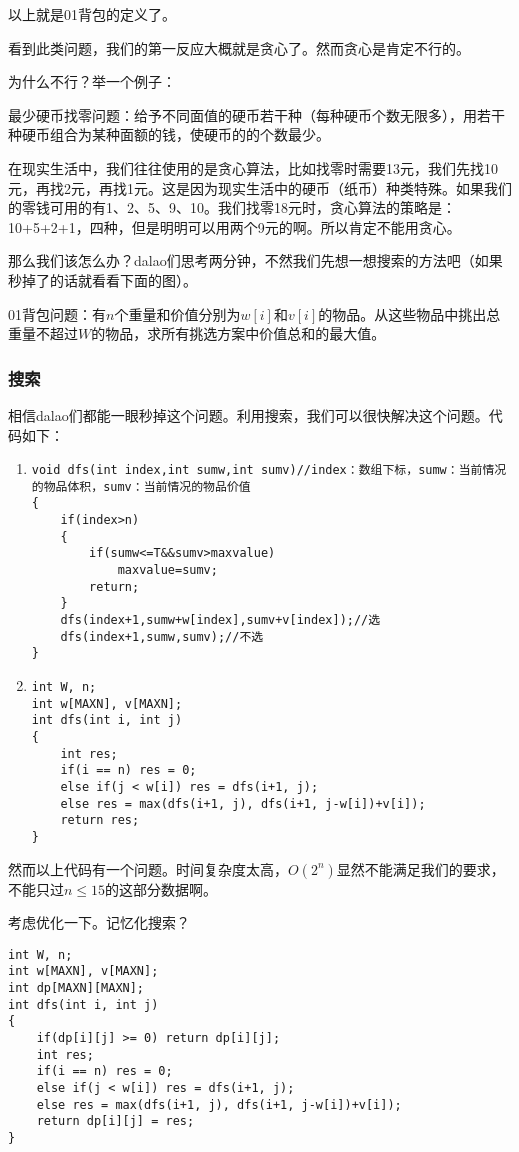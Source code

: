 以上就是\rm{01}背包的定义了。

看到此类问题，我们的第一反应大概就是贪心了。然而贪心是肯定不行的。

为什么不行？举一个例子：
\begin{example}最少硬币找零问题：给予不同面值的硬币若干种（每种硬币个数无限多），用若干种硬币组合为某种面额的钱，使硬币的的个数最少。\end{example}

在现实生活中，我们往往使用的是贪心算法，比如找零时需要13元，我们先找10元，再找2元，再找1元。这是因为现实生活中的硬币（纸币）种类特殊。如果我们的零钱可用的有1、2、5、9、10。我们找零18元时，贪心算法的策略是：10+5+2+1，四种，但是明明可以用两个9元的啊。所以肯定不能用贪心。

那么我们该怎么办？dalao们思考两分钟，不然我们先想一想搜索的方法吧（如果秒掉了的话就看看下面的图）。


\newpage
\begin{example}\rm{01}背包问题：有$n$个重量和价值分别为$w[i]$和$v[i]$的物品。从这些物品中挑出总重量不超过$W$的物品，求所有挑选方案中价值总和的最大值。\end{example}

\subsubsection{搜索}
相信dalao们都能一眼秒掉这个问题。利用搜索，我们可以很快解决这个问题。代码如下：
\begin{enumerate}
\item \begin{verbatim}
void dfs(int index,int sumw,int sumv)//index：数组下标，sumw：当前情况的物品体积，sumv：当前情况的物品价值
{ 
    if(index>n)  
    {  
        if(sumw<=T&&sumv>maxvalue)  
            maxvalue=sumv;  
        return;  
    }  
    dfs(index+1,sumw+w[index],sumv+v[index]);//选
    dfs(index+1,sumw,sumv);//不选
}\end{verbatim}
\item \begin{verbatim}  
int W, n;
int w[MAXN], v[MAXN];  
int dfs(int i, int j)
{  
    int res;  
    if(i == n) res = 0;   
    else if(j < w[i]) res = dfs(i+1, j);  
    else res = max(dfs(i+1, j), dfs(i+1, j-w[i])+v[i]);  
    return res;  
}
\end{verbatim}
\end{enumerate}
然而以上代码有一个问题。时间复杂度太高，$O(2^n)$显然不能满足我们的要求，不能只过$n\leq15$的这部分数据啊。

考虑优化一下。记忆化搜索？
\begin{verbatim}
int W, n;    
int w[MAXN], v[MAXN];  
int dp[MAXN][MAXN];  
int dfs(int i, int j)
{  
    if(dp[i][j] >= 0) return dp[i][j];  
    int res;   
    if(i == n) res = 0; 
    else if(j < w[i]) res = dfs(i+1, j);   
    else res = max(dfs(i+1, j), dfs(i+1, j-w[i])+v[i]);  
    return dp[i][j] = res;  
}
\end{verbatim}

